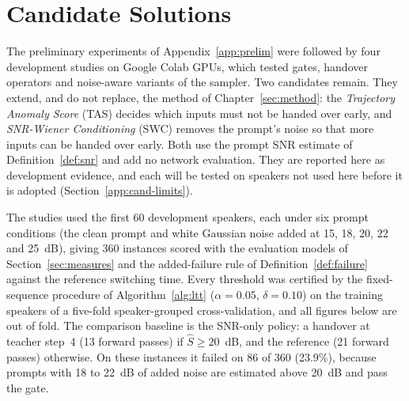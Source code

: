 
\section[APPENDIX E.\ CANDIDATE SOLUTIONS]{Candidate Solutions}
\label{app:candidates}

The preliminary experiments of Appendix~\ref{app:prelim} were followed by four development studies on Google Colab GPUs, which tested gates, handover operators and noise-aware variants of the sampler. Two candidates remain. They extend, and do not replace, the method of Chapter~\ref{sec:method}: the \emph{Trajectory Anomaly Score} (TAS) decides which inputs must not be handed over early, and \emph{SNR-Wiener Conditioning} (SWC) removes the prompt's noise so that more inputs can be handed over early. Both use the prompt SNR estimate of Definition~\ref{def:snr} and add no network evaluation. They are reported here as development evidence, and each will be tested on speakers not used here before it is adopted (Section~\ref{app:cand-limits}).

The studies used the first 60 development speakers, each under six prompt conditions (the clean prompt and white Gaussian noise added at 15, 18, 20, 22 and 25~dB), giving 360 instances scored with the evaluation models of Section~\ref{sec:measures} and the added-failure rule of Definition~\ref{def:failure} against the reference switching time. Every threshold was certified by the fixed-sequence procedure of Algorithm~\ref{alg:ltt} ($\alpha=0.05$, $\delta=0.10$) on the training speakers of a five-fold speaker-grouped cross-validation, and all figures below are out of fold. The comparison baseline is the SNR-only policy: a handover at teacher step~4 (13 forward passes) if $\hat S\ge20$~dB, and the reference (21 forward passes) otherwise. On these instances it failed on 86 of 360 (23.9\%), because prompts with 18 to 22~dB of added noise are estimated above 20~dB and pass the gate.

